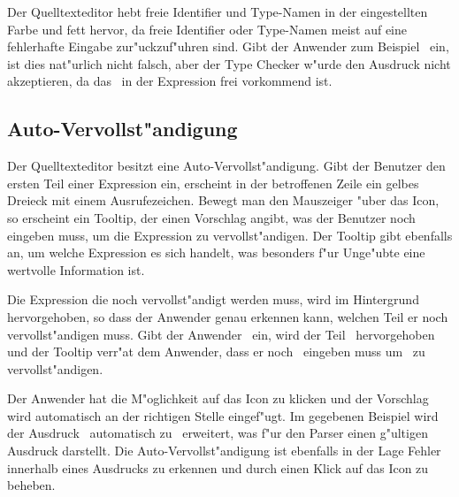 Der Quelltexteditor hebt freie Identifier und Type-Namen in der eingestellten
Farbe und fett hervor, da freie Identifier oder Type-Namen meist auf eine
fehlerhafte Eingabe zur"uckzuf"uhren sind. Gibt der Anwender zum Beispiel
\grqq\ ein, ist dies nat"urlich nicht falsch, aber
der Type Checker w"urde den Ausdruck nicht akzeptieren, da das \grqq\ 
in der Expression frei vorkommend ist.

\subsection{Auto-Vervollst"andigung}
\label{Auto-Vervollstaendigung}
Der Quelltexteditor besitzt eine Auto-Vervollst"andigung. Gibt der Benutzer
den ersten Teil einer Expression ein, erscheint in der betroffenen Zeile ein
gelbes Dreieck mit einem Ausrufezeichen. Bewegt man den Mauszeiger "uber
das Icon, so erscheint ein Tooltip, der einen Vorschlag angibt, was der
Benutzer noch eingeben muss, um die Expression zu vervollst"andigen. Der
Tooltip gibt ebenfalls an, um welche Expression es sich handelt, was
besonders f"ur Unge"ubte eine wertvolle Information ist.

Die Expression die noch vervollst"andigt werden muss, wird im Hintergrund
hervorgehoben, so dass der Anwender genau erkennen kann, welchen Teil er
noch vervollst"andigen muss. Gibt der Anwender \glqq{\bf 1 + let x =}\grqq\ 
ein, wird der Teil \grqq\ hervorgehoben und der Tooltip
verr"at dem Anwender, dass er noch \glqq{\bf e1 in e2}\grqq\ eingeben muss
um \glqq{\bf Let}\grqq\ zu vervollst"andigen.

Der Anwender hat die M"oglichkeit auf das Icon zu klicken und der Vorschlag
wird automatisch an der richtigen Stelle eingef"ugt. Im gegebenen Beispiel
wird der Ausdruck \glqq{\bf 1 + let x =}\grqq\ automatisch zu
\glqq{\bf 1 + let x = e1 in e2}\grqq\ erweitert, was f"ur den Parser einen
g"ultigen Ausdruck darstellt. Die Auto-Vervollst"andigung ist ebenfalls in
der Lage Fehler innerhalb eines Ausdrucks zu erkennen und durch einen Klick
auf das Icon zu beheben.



